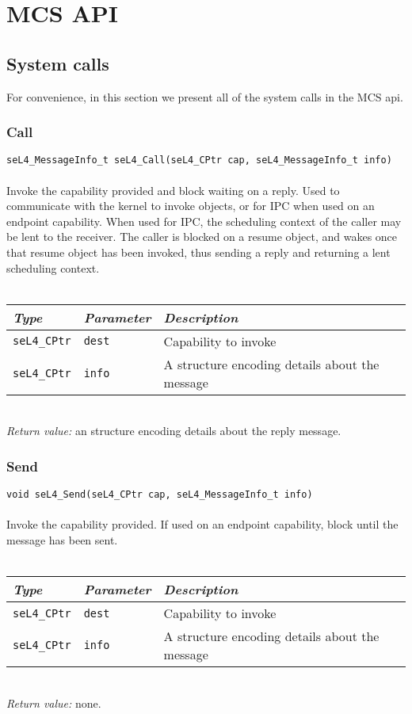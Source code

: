 
\chapter{MCS API}
\label{appendix:api}

\newcommand{\apidoc}[6]
{
    \subsection{\label{api:#1}#2}
    \texttt{#4}\\
    \vspace{3pt}\\
    \noindent
    #3\\
    \vspace{3pt}\\
    \begin{tabularx}{\textwidth}{llX}\toprule
        \emph{Type} & \emph{Parameter} & \emph{Description} \\\midrule
         #5
        \bottomrule
    \end{tabularx}
    \vspace{3pt}\\
    \noindent
    \textit{Return value:} #6 
}

\newcommand{\param}[3]
{
\texttt{#1} & \texttt{#2} & #3 \\
}
\section{System calls}

For convenience, in this section we present all of the system calls in the MCS api.

\apidoc{call}
{Call}
{Invoke the capability provided and block waiting on a reply. Used to communicate with the kernel 
 to invoke objects, or for \gls{IPC} when used on an endpoint capability. When used for \gls{IPC}, 
  the scheduling context of the caller may be lent to the receiver. The caller is blocked on a
  resume object, and wakes once that resume object has been invoked, thus sending a reply and
  returning a lent scheduling context.}
  {seL4_MessageInfo_t seL4_Call(seL4_CPtr cap, seL4_MessageInfo_t info)}
{
    \param{seL4\_CPtr}{dest}{Capability to invoke}
    \param{seL4\_CPtr}{info}{A \code{seL4\_MessageInfo\_t} structure encoding details about the message}
}
{an \code{seL4\_MessageInfo\_t} structure encoding details about the reply message.}

\apidoc{send}
{Send}
{Invoke the capability provided. If used on an endpoint capability, block until the message has been
sent.}
{void seL4_Send(seL4_CPtr cap, seL4_MessageInfo_t info)}
{
    \param{seL4\_CPtr}{dest}{Capability to invoke}
    \param{seL4\_CPtr}{info}{A \code{seL4\_MessageInfo\_t} structure encoding details about the message}
}
{none.}

